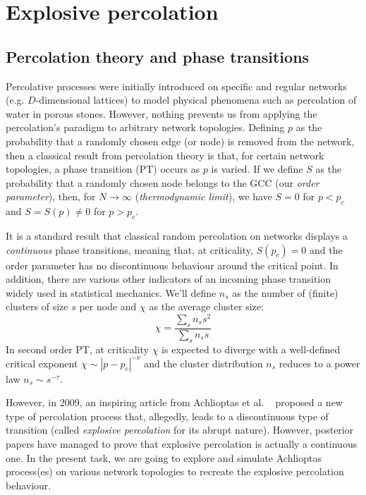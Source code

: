 \chapter{Explosive percolation}




\section{Percolation theory and phase transitions}

Percolative processes were initially introduced on specific and regular networks (e.g. $D$-dimensional lattices) to model physical phenomena such as percolation of water in porous stones. However, nothing prevents us from applying the percolation's paradigm to arbitrary network topologies. Defining $p$ as the probability that a randomly chosen edge (or node) is removed from the network, then a classical result from percolation theory is that, for certain network topologies, a phase transition (PT) occurs as $p$ is varied. If we define $S$ as the probability that a randomly chosen node belongs to the GCC (our \textit{order parameter}), then, for $N \to \infty$ (\textit{thermodynamic limit}), we have $S = 0$ for $p < p_c$ and $S = S(p) \neq 0$ for $p > p_c$.

It is a standard result \cite{Li_2021} that classical random percolation on networks displays a \textit{continuous} phase transitions, meaning that, at criticality, $S(p_c) = 0$ and the order parameter has no discontinuous behaviour around the critical point. In addition, there are various other indicators of an incoming phase transition widely used in statistical mechanics. We'll define $n_s$ as the number of (finite) clusters of size $s$ per node and $\chi$ as the average cluster size:
\begin{equation}
	\chi = \frac{\sum_s n_s s^2}{\sum_s n_s s}
\end{equation}
In second order PT, at criticality $\chi$ is expected to diverge with a well-defined critical exponent $\chi \sim |p-p_c|^{-\nu}$ and the cluster distribution $n_s$ reduces to a power law $n_s \sim s^{-\tau}$.
 
However, in 2009, an inspiring article from Achlioptas et al. ~\cite{Achlioptas} proposed a new type of percolation process that, allegedly, leads to a discontinuous type of transition (called \textit{explosive percolation} for its abrupt nature). However, posterior papers \cite{cont} have managed to prove that explosive percolation is actually a continuous one. In the present task, we are going to explore and simulate Achlioptas process(es) on various network topologies to recreate the explosive percolation behaviour.
\label{par::intro}

